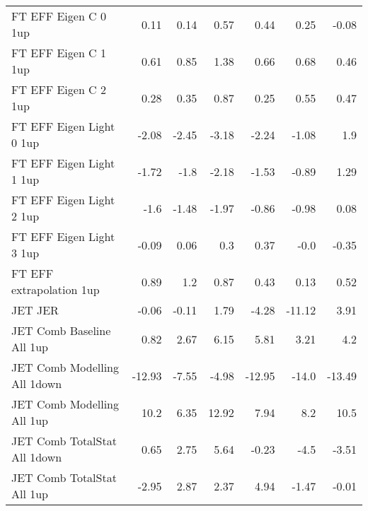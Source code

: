 \begin{table}[htbp]
{\begin{tabular}{lrrrrrr}
FT EFF Eigen C 0  1up        & 0.11               & 0.14               & 0.57              & 0.44              & 0.25              & -0.08             \\
FT EFF Eigen C 1  1up        & 0.61               & 0.85               & 1.38              & 0.66              & 0.68              & 0.46              \\
FT EFF Eigen C 2  1up        & 0.28               & 0.35               & 0.87              & 0.25              & 0.55              & 0.47              \\
FT EFF Eigen Light 0  1up    & -2.08              & -2.45              & -3.18             & -2.24             & -1.08             & 1.9               \\
FT EFF Eigen Light 1  1up    & -1.72              & -1.8               & -2.18             & -1.53             & -0.89             & 1.29              \\
FT EFF Eigen Light 2  1up    & -1.6               & -1.48              & -1.97             & -0.86             & -0.98             & 0.08              \\
FT EFF Eigen Light 3  1up    & -0.09              & 0.06               & 0.3               & 0.37              & -0.0              & -0.35             \\
FT EFF extrapolation  1up      & 0.89               & 1.2                & 0.87              & 0.43              & 0.13              & 0.52              \\
JET JER                           & -0.06              & -0.11              & 1.79              & -4.28             & -11.12            & 3.91              \\
JET Comb Baseline All  1up    & 0.82               & 2.67               & 6.15              & 5.81              & 3.21              & 4.2               \\
JET Comb Modelling All  1down & -12.93             & -7.55              & -4.98             & -12.95            & -14.0             & -13.49            \\
JET Comb Modelling All  1up   & 10.2               & 6.35               & 12.92             & 7.94              & 8.2               & 10.5              \\
JET Comb TotalStat All  1down & 0.65               & 2.75               & 5.64              & -0.23             & -4.5              & -3.51             \\
JET Comb TotalStat All  1up   & -2.95              & 2.87               & 2.37              & 4.94              & -1.47             & -0.01             \\

\end{tabular}}
\end{table}
